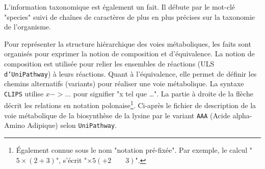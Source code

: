 \begin{refsegment}
L'information taxonomique est également un fait. Il débute par le mot-clé "species" suivi de chaînes de caractères de plus en plus précises sur la taxonomie de l'organisme.


Pour représenter la structure hiérarchique des voies métaboliques, les faits sont organisés pour exprimer la notion de composition et d'équivalence. La notion de composition est utilisée pour relier les ensembles de réactions (\gls{ULS} \texttt{d'UniPathway}) à leurs réactions. Quant à l'équivalence, elle permet de définir les chemins alternatifs (variants) pour réaliser une voie métabolique. La syntaxe \texttt{\gls{CLIPS}} utilise $x -> \ldots$ pour signifier "x tel que \ldots". La partie à droite de la flèche décrit les relations en notation polonaise\footnote{Également connue sous le nom "notation pré-fixée". Par exemple, le calcul "$5 \times (2 + 3)$", s'écrit "$\times 5 (+ 2 \qquad 3)$". }. Ci-après le fichier de description de la voie métabolique de la biosynthèse de la lysine par le variant \texttt{AAA} (Acide alpha-Amino Adipique) selon \texttt{UniPathway}.


\end{refsegment}
